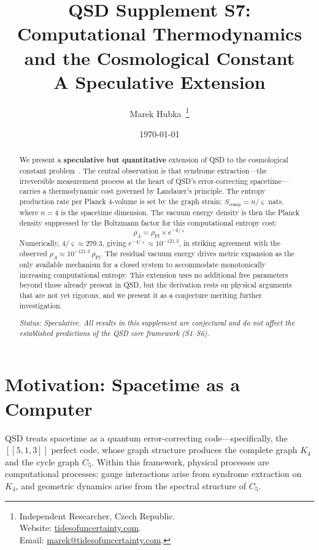 \documentclass[11pt,a4paper]{article}
\title{
  \textbf{QSD Supplement S7: \\[0.5em] Computational Thermodynamics \\ and the Cosmological Constant}\\[0.5em]
  \Large A Speculative Extension\\[1em]
}
\author{
  Marek Hubka\, \orcidlink{0009-0003-2476-9017}
  \thanks{
    Independent Researcher, Czech Republic.\\
    Website: \href{http://www.tidesofuncertainty.com}{tidesofuncertainty.com}.\\
    Email: \href{mailto:marek@tidesofuncertainty.com}{marek@tidesofuncertainty.com}.
  }
}
\date{\today}
\theoremstyle{definition}
\newcommand{\strain}{\varsigma}            %
\newcommand{\rhoL}{\rho_{\Lambda}}
\newcommand{\rhoPl}{\rho_{\text{Pl}}}
\begin{document}
\maketitle

\begin{abstract}
We present a \textbf{speculative but quantitative} extension of QSD to the cosmological constant problem~\cite{Weinberg1989}. The central observation is that syndrome extraction---the irreversible measurement process at the heart of QSD's error-correcting spacetime---carries a thermodynamic cost governed by Landauer's principle. The entropy production rate per Planck 4-volume is set by the graph strain: $S_{\text{comp}} = n/\strain$ nats, where $n = 4$ is the spacetime dimension. The vacuum energy density is then the Planck density suppressed by the Boltzmann factor for this computational entropy cost:
\[
    \rhoL = \rhoPl \times e^{-4/\strain}
\]
Numerically, $4/\strain \approx 279.3$, giving $e^{-4/\strain} \approx 10^{-121.3}$, in striking agreement with the observed $\rhoL \approx 10^{-121.3}\,\rhoPl$. The residual vacuum energy drives metric expansion as the only available mechanism for a closed system to accommodate monotonically increasing computational entropy. This extension uses no additional free parameters beyond those already present in QSD, but the derivation rests on physical arguments that are not yet rigorous, and we present it as a conjecture meriting further investigation.

\medskip
\noindent\textit{Status: Speculative.  All results in this supplement are conjectural and do not affect the established predictions of the QSD core framework (S1--S6).}
\end{abstract}

\tableofcontents

\section{Motivation: Spacetime as a Computer}

QSD treats spacetime as a quantum error-correcting code---specifically, the $[[5,1,3]]$ perfect code, whose graph structure produces the complete graph $K_4$ and the cycle graph $C_5$. Within this framework, physical processes are computational processes: gauge interactions arise from syndrome extraction on $K_4$, and geometric dynamics arise from the spectral structure of $C_5$.
\end{document}
